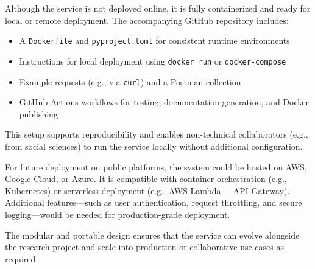 Although the service is not deployed online, it is fully containerized and ready for local or remote deployment. The
accompanying GitHub repository includes:

\begin{itemize}
    \item A \texttt{Dockerfile} and \texttt{pyproject.toml} for consistent runtime environments
    \item Instructions for local deployment using \texttt{docker run} or \texttt{docker-compose}
    \item Example requests (e.g., via \texttt{curl}) and a Postman collection
    \item GitHub Actions workflows for testing, documentation generation, and Docker publishing
\end{itemize}

This setup supports reproducibility and enables non-technical collaborators (e.g., from social sciences) to run the
service locally without additional configuration.

For future deployment on public platforms, the system could be hosted on AWS, Google Cloud, or Azure. It is
compatible with container orchestration (e.g., Kubernetes) or serverless deployment (e.g., AWS Lambda + \ac{API}
Gateway). Additional features—such as user authentication, request throttling, and secure logging—would be needed
for production-grade deployment.

The modular and portable design ensures that the service can evolve alongside the research project and scale into
production or collaborative use cases as required.


